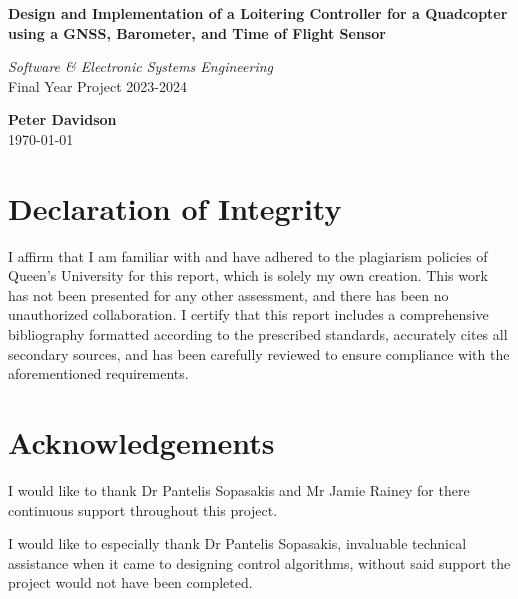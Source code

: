 \documentclass{report}
\begin{document}
\onehalfspacing

\begin{titlepage}
    \begin{center}
        
        \textbf{\Large Design and Implementation of a Loitering Controller for a
        Quadcopter using a GNSS, Barometer, and Time of Flight Sensor}\\
        \vspace{1.5cm} 
        
        \textit{\large Software \& Electronic Systems Engineering}\\
        \vspace{0.5cm} 
        Final Year Project 2023-2024\\
        \vspace{2cm} 
        
        \textbf{Peter Davidson}\\
        \vspace{0.5cm} 
        \today
        
        \vfill
        
    \end{center}
    \thispagestyle{fancy}
\end{titlepage}
 
\newpage
\pagestyle{plain}

\section*{Declaration of Integrity}
I affirm that I am familiar with and have adhered to the plagiarism policies of
Queen's University for this report, which is solely my own creation. This work
has not been presented for any other assessment, and there has been no
unauthorized collaboration. I certify that this report includes a comprehensive
bibliography formatted according to the prescribed standards, accurately cites
all secondary sources, and has been carefully reviewed to ensure compliance with
the aforementioned requirements.
\newpage

\section*{Acknowledgements}
I would like to thank Dr Pantelis Sopasakis and Mr Jamie Rainey for there
continuous support throughout this project. 

I would like to especially thank Dr Pantelis Sopasakis, invaluable technical
assistance when it came to designing control algorithms, without said support
the project would not have been completed.
\newpage
\end{document}
